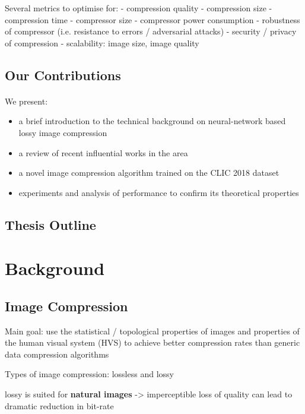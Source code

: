 \documentclass{article}
\begin{document}
Several metrics to optimise for:
- compression quality
- compression size
- compression time
- compressor size
- compressor power consumption
- robustness of compressor (i.e. resistance to errors / adversarial attacks)
- security / privacy of compression
- scalability: image size, image quality

\subsection{Our Contributions}
\paragraph{}

We present:
\begin{itemize}
\item a brief introduction to the technical background on neural-network
  based lossy image compression
\item a review of recent influential works in the area

\item a novel image compression algorithm trained on the CLIC 2018 dataset \cite{clic2018}

\item experiments and analysis of performance to confirm its theoretical properties
\end{itemize}

\subsection{Thesis Outline}
\paragraph{}

\section{Background}
\subsection{Image Compression}
Main goal: use the statistical / topological properties of images and properties
of the human visual system (HVS) to achieve
better compression rates than generic data compression algorithms

Types of image compression: lossless and lossy

lossy is suited for \textbf{natural images} -> imperceptible loss of quality can
lead to dramatic reduction in bit-rate
\end{document}
